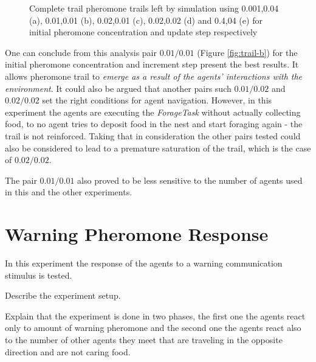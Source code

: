 \begin{figure}[H]
 \quad

\caption[Example of complete pheromone trails]{Complete trail pheromone trails left by simulation using 0.001,0.04 (a), 0.01,0.01 (b), 0.02,0.01 (c), 0.02,0.02 (d) and 0.4,04 (e) for initial pheromone concentration and update step respectively}
\label{fig:trails}
\end{figure}

One can conclude from this analysis pair $0.01/0.01$ (Figure \ref{fig:trail-b}) for the initial pheromone concentration and increment step present the best results. It allows pheromone trail to \emph{emerge as a result of the agents' interactions with the environment}. It could also be argued that another pairs such $0.01/0.02$ and $0.02/0.02$ set the right conditions for agent navigation. However, in this experiment the agents are executing the \emph{ForageTask} without actually collecting food, to no agent tries to deposit food in the nest and start foraging again - the trail is not reinforced. Taking that in consideration the other pairs tested could also be considered to lead to a premature saturation of the trail, which is the case of $0.02/0.02$.

The pair $0.01/0.01$ also proved to be less sensitive to the number of agents used in this and the other experiments.

\section{Warning Pheromone Response}
\label{sec:warn-phero-inv}
In this experiment the response of the agents to a warning communication stimulus is tested.

Describe the experiment setup.

Explain that the experiment is done in two phases, the first one the agents react only to amount of warning pheromone and the second one the agents react also to the number of other agents they meet that are traveling in the opposite direction and are not caring food.

